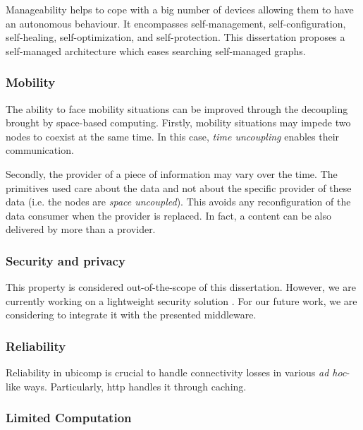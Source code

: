 Manageability helps to cope with a big number of devices allowing them to have an autonomous behaviour. %
It encompasses self-management, self-configuration, self-healing, self-optimization, and self-protection.
This dissertation proposes a self-managed architecture which eases searching self-managed graphs.


\subsubsection{Mobility}

The ability to face mobility situations can be improved through the decoupling brought by space-based computing.
Firstly, mobility situations may impede two nodes to coexist at the same time.
In this case, \emph{time uncoupling} enables their communication.

Secondly, the provider of a piece of information may vary over the time.
The primitives used care about the data and not about the specific provider of these data (i.e. the nodes are \emph{space uncoupled}).
This avoids any reconfiguration of the data consumer when the provider is replaced.
In fact, a content can be also delivered by more than a provider.


\subsubsection{Security and privacy}

This property is considered out-of-the-scope of this dissertation.
However, we are currently working on a lightweight security solution \citep{naranjo_lightweight_2012}. %
For our future work, we are considering to integrate it with the presented middleware.


\subsubsection{Reliability}

Reliability in \ac{ubicomp} is crucial to handle connectivity losses in various \emph{ad hoc}-like ways.
Particularly, \ac{http} handles it through caching.


\subsubsection{Limited Computation}

